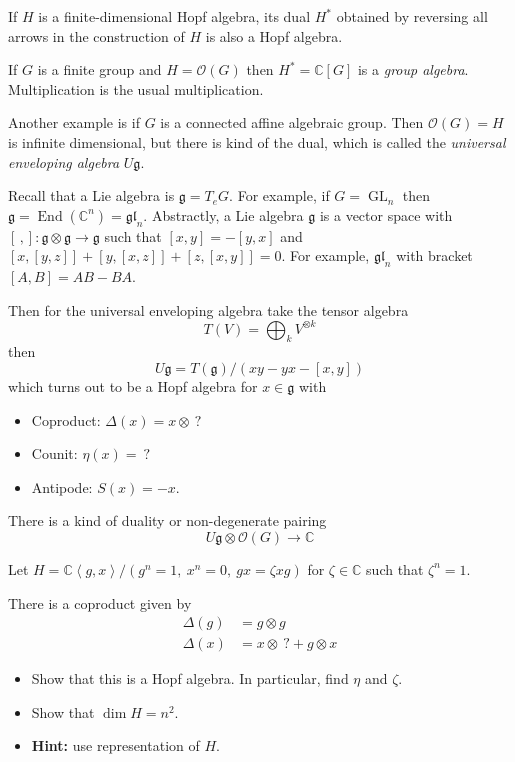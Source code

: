 \begin{example}[2, Dual]
\label{example-l1-dual}
If $H$ is a finite-dimensional Hopf
algebra, its dual $H^{*}$ obtained by
reversing all arrows in the construction
of $H$ is also a Hopf algebra.

If $G$ is a finite group and
$H=\mathcal{O}(G)$ then
$H^{*} =\mathbb{C}[G]$ is a
{\it group algebra}. Multiplication is the
usual multiplication.

Another example is if $G$ is a connected
affine algebraic group. Then
$\mathcal{O}(G)=H$ is infinite
dimensional, but there is kind of the
dual, which is called the
{\it universal enveloping algebra}
$U\mathfrak{g}$.

Recall that a Lie algebra is
$\mathfrak{g}=T_{e}G$. For example, if
$G=\operatorname{GL}_{n}$ then
$\mathfrak{g}=
\operatorname{End}(\mathbb{C}^{n})=
\mathfrak{gl}_{n}$. Abstractly, a Lie
algebra $\mathfrak{g}$ is a vector space
with
$[\,,]:\mathfrak{g}\otimes\mathfrak{g}
\to\mathfrak{g}$ such that
$[x,y]=-[y,x]$ and
$[x,[y,z]]+[y,[x,z]]+[z,[x,y]]=0$.
For example, $\mathfrak{gl}_{n}$ with
bracket $[A,B]=AB-BA$.

Then for the universal enveloping algebra
take the tensor algebra
$$
T(V)=\bigoplus_{k} V^{\otimes k}
$$
then
$$
U\mathfrak{g}=T(\mathfrak{g})/(xy-yx-[x,y])
$$
which turns out to be a Hopf algebra for
$x\in \mathfrak{g}$ with
\begin{itemize}
\item Coproduct: $\Delta(x)=x\otimes\ ?$
\item Counit: $\eta(x)=\ ?$
\item Antipode: $S(x)=-x$.
\end{itemize}
There is a kind of duality or
non-degenerate pairing
$$
U\mathfrak{g}\otimes \mathcal{O}(G)
\to \mathbb{C}
$$
\end{example}

\begin{example}[3, exercise]
\label{example-l1-exercise}
Let $H=\mathbb{C}\left\langle{}
g,x\right\rangle{} / (g^{n}=1,\ x^{n}=0,\
gx=\zeta xg)$ for $\zeta\in \mathbb{C}$
such that $\zeta^{n}=1$.

There is a coproduct given by
$$
\begin{aligned}
\Delta(g)&=g\otimes g\\
\Delta(x)&=x\otimes\ ?+g\otimes x
\end{aligned}
$$
\begin{itemize}
\item Show that this is a Hopf algebra.
In particular, find $\eta$ and $\zeta$.
\item Show that $\dim H=n^{2}$.
\item {\bf Hint:} use representation of
$H$.
\end{itemize}
\end{example}

